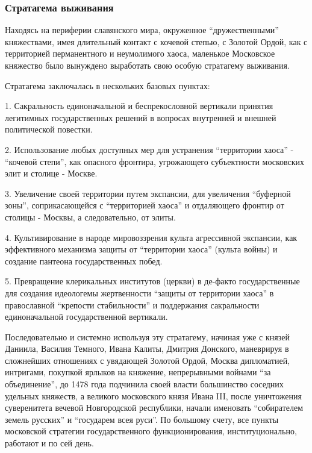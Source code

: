  
 
 
 
 

\subsubsection{Стратагема выживания}
\label{sec:16_01_2022.stz.news.ua.hvylya.1.anatomia_vraga.3.stratagema_vyzhyvania}

Находясь на периферии славянского мира, окруженное \enquote{дружественными}
княжествами, имея длительный контакт с кочевой степью, с Золотой Ордой, как с
территорией перманентного и неумолимого хаоса, маленькое Московское княжество
было вынуждено выработать свою особую стратагему выживания.

Стратагема заключалась в нескольких базовых пунктах:

1. Сакральность единоначальной и беспрекословной вертикали принятия легитимных
государственных решений в вопросах внутренней и внешней политической повестки.

2. Использование любых доступных мер для устранения \enquote{территории хаоса} -
\enquote{кочевой степи}, как опасного фронтира, угрожающего субъектности московских
элит и столице - Москве.

3. Увеличение своей территории путем экспансии, для увеличения \enquote{буферной зоны},
соприкасающейся с \enquote{территорией хаоса} и отдаляющего фронтир от столицы -
Москвы, а следовательно, от элиты.

4. Культивирование в народе мировоззрения культа агрессивной экспансии, как
эффективного механизма защиты от \enquote{территории хаоса} (культа войны) и создание
пантеона государственных побед.

5. Превращение клерикальных институтов (церкви) в де-факто государственные для
создания идеологемы жертвенности \enquote{защиты от территории хаоса} в православной
\enquote{крепости стабильности} и поддержания сакральности единоначальной
государственной вертикали.

Последовательно и системно используя эту стратагему, начиная уже с князей
Даниила, Василия Темного, Ивана Калиты, Дмитрия Донского, маневрируя в
сложнейших отношениях с увядающей Золотой Ордой, Москва дипломатией, интригами,
покупкой ярлыков на княжение, непрерывными войнами \enquote{за объединение}, до 1478
года подчинила своей власти большинство соседних удельных княжеств, а великого
московского князя Ивана III, после уничтожения суверенитета вечевой
Новгородской республики, начали именовать \enquote{собирателем земель русских} и
\enquote{государем всея руси}. По большому счету, все пункты московской стратегии
государственного функционирования, институционально, работают и по сей день.

